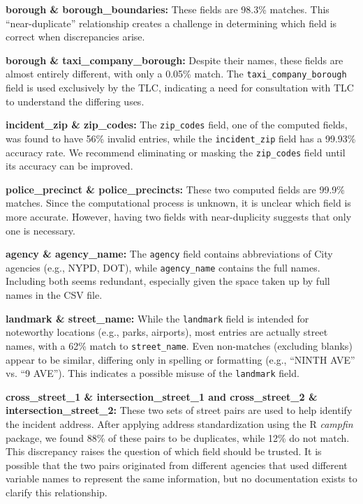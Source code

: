 \documentclass[linenumber]{jdsart}
\begin{document}
\textbf{borough \& borough\_boundaries:} These fields are 98.3\% matches. 
This ``near-duplicate'' relationship creates a challenge in determining 
which field is correct when discrepancies arise.

\textbf{borough \& taxi\_company\_borough:} Despite their names, these 
fields are almost entirely different, with only a 0.05\% match. The 
\texttt{taxi\_company\_borough} field is used exclusively by the TLC, 
indicating a need for consultation with TLC to understand the differing 
uses.

\textbf{incident\_zip \& zip\_codes:} The \texttt{zip\_codes} field, 
one of the computed fields, was found to have 56\% invalid entries, 
while the \texttt{incident\_zip} field has a 99.93\% accuracy rate. 
We recommend eliminating or masking the \texttt{zip\_codes} field 
until its accuracy can be improved.

\textbf{police\_precinct \& police\_precincts:} These two computed 
fields are 99.9\% matches. Since the computational process is unknown, 
it is unclear which field is more accurate. However, having two fields 
with near-duplicity suggests that only one is necessary.

\textbf{agency \& agency\_name:} The \texttt{agency} field contains 
abbreviations of City agencies (e.g., NYPD, DOT), while 
\texttt{agency\_name} contains the full names. Including both seems 
redundant, especially given the space taken up by full names in the 
CSV file.

\textbf{landmark \& street\_name:} While the \texttt{landmark} field is 
intended for noteworthy locations (e.g., parks, airports), most entries 
are actually street names, with a 62\% match to \texttt{street\_name}. 
Even non-matches (excluding blanks) appear to be similar, differing 
only in spelling or formatting (e.g., ``NINTH AVE'' vs. ``9 AVE''). This 
indicates a possible misuse of the \texttt{landmark} field.

\textbf{cross\_street\_1 \& intersection\_street\_1 and cross\_street\_2 
\& intersection\_street\_2:} These two sets of street pairs are used to 
help identify the incident address. After applying address 
standardization using the R \textit{campfin} package, we found 88\% of 
these pairs to be duplicates, while 12\% do not match. This discrepancy 
raises the question of which field should be trusted. It is possible 
that the two pairs originated from different agencies that used 
different variable names to represent the same information, but no 
documentation exists to clarify this relationship.
\end{document}
